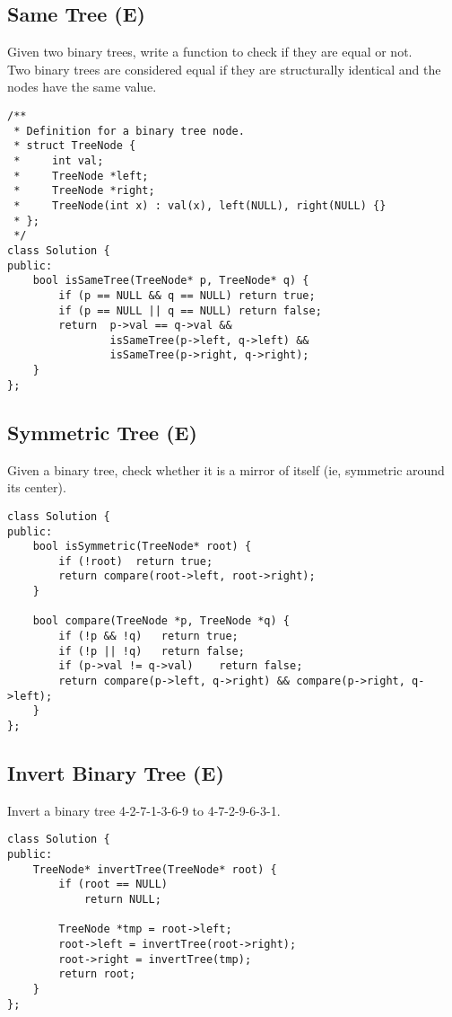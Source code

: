 \subsection{Same Tree (E)}
Given two binary trees, write a function to check if they are equal or not. \\

Two binary trees are considered equal if they are structurally identical and the nodes have the same value. \\

\begin{lstlisting}
/**
 * Definition for a binary tree node.
 * struct TreeNode {
 *     int val;
 *     TreeNode *left;
 *     TreeNode *right;
 *     TreeNode(int x) : val(x), left(NULL), right(NULL) {}
 * };
 */
class Solution {
public:
    bool isSameTree(TreeNode* p, TreeNode* q) {
        if (p == NULL && q == NULL)	return true;
        if (p == NULL || q == NULL)	return false;
        return  p->val == q->val &&
                isSameTree(p->left, q->left) &&
                isSameTree(p->right, q->right);
    }
};
\end{lstlisting}


\subsection{Symmetric Tree (E)}
Given a binary tree, check whether it is a mirror of itself (ie, symmetric around its center).\\

\begin{lstlisting}
class Solution {
public:
    bool isSymmetric(TreeNode* root) {
        if (!root)  return true;
        return compare(root->left, root->right);
    }
    
    bool compare(TreeNode *p, TreeNode *q) {
        if (!p && !q)   return true;
        if (!p || !q)   return false;
        if (p->val != q->val)    return false;
        return compare(p->left, q->right) && compare(p->right, q->left);
    }
};
\end{lstlisting}


\subsection{Invert Binary Tree (E)}
Invert a binary tree 4-2-7-1-3-6-9 to 4-7-2-9-6-3-1. \\

\begin{lstlisting}
class Solution {
public:
    TreeNode* invertTree(TreeNode* root) {
        if (root == NULL)
            return NULL;
            
        TreeNode *tmp = root->left;
        root->left = invertTree(root->right);
        root->right = invertTree(tmp);
        return root;
    }
};
\end{lstlisting}


